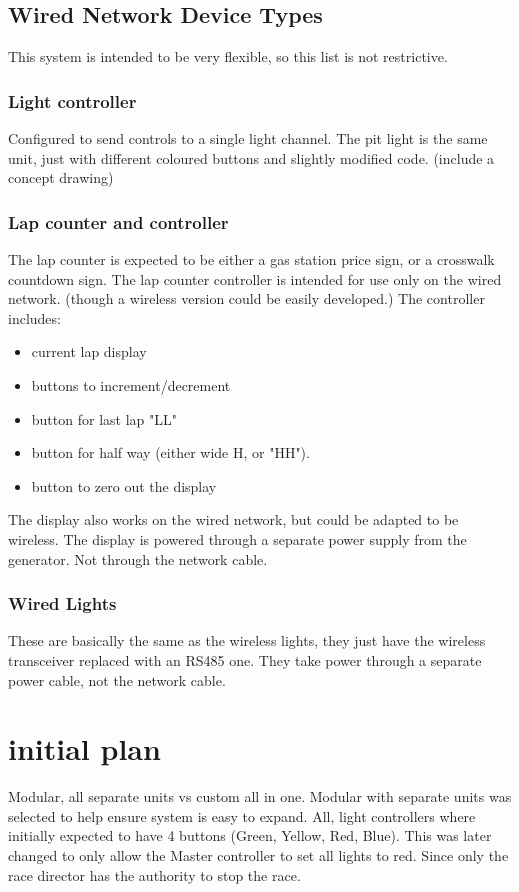 \documentclass{article}
\begin{document}
     \subsection{Wired Network Device Types}
     	This system is intended to be very flexible, so this list is not restrictive.
     	\subsubsection{Light controller}
     	Configured to send controls to a single light channel.
     	The pit light is the same unit, just with different coloured buttons and slightly modified code.
     	(include a concept drawing)
     	\subsubsection{Lap counter and controller}
     	The lap counter is expected to be either a gas station price sign, or a crosswalk countdown sign.
     	The lap counter controller is intended for use only on the wired network. (though a wireless version could be easily developed.)
     	The controller includes:
     	\begin{itemize}
     		\item current lap display
     		\item buttons to increment/decrement
     		\item button for last lap "LL"
     		\item button for half way (either wide H, or "HH").
     		\item button to zero out the display
     	\end{itemize}
     	The display also works on the wired network, but could be adapted to be wireless.
     	The display is powered through a separate power supply from the generator. Not through the network cable.
     	\subsubsection{Wired Lights}
     	These are basically the same as the wireless lights, they just have the wireless transceiver replaced with an RS485 one.
     	They take power through a separate power cable, not the network cable.
     \section{initial plan}
     Modular, all separate units vs custom all in one. 
     Modular with separate units was selected to help ensure system is easy to expand.
     All, light controllers where initially expected to have 4 buttons (Green, Yellow, Red, Blue).
     This was later changed to only allow the Master controller to set all lights to red. 
     Since only the race director has the authority to stop the race.
     
\end{document}
